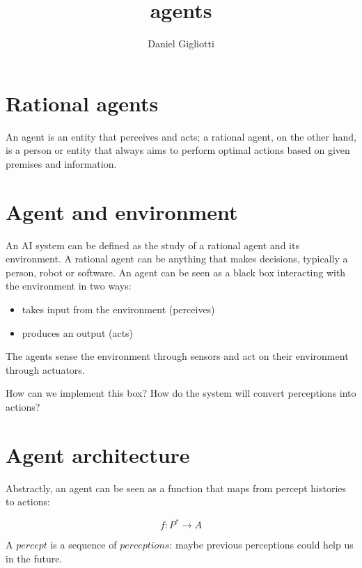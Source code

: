 \documentclass{article}
\title{agents}
\author{Daniel Gigliotti}
\date{}
\begin{document}
\maketitle

\section{Rational agents}

An agent is an entity that perceives and acts; a rational agent, on the other hand, is a person or entity that always aims to perform optimal actions based on given premises and information.

\section{Agent and environment}

An AI system can be defined as the study of a rational agent and its environment. 
A rational agent can be anything that makes decisions, typically a person, robot or software. An agent can be seen as a black box interacting with the environment in two ways:

\begin{center}
    \begin{itemize}
        \item takes input from the environment (perceives)
        \item produces an output (acts)
    \end{itemize}
\end{center}

The agents sense the environment through sensors and act on their environment through actuators.

How can we implement this box? How do the system will convert perceptions into actions?

\section{Agent architecture}

Abstractly, an agent can be seen as a function that maps from percept histories to actions:

\begin{center}
    \begin{equation}
        f: P^{*} \rightarrow A
    \end{equation}
\end{center}

A $percept$ is a sequence of $perceptions$: maybe previous perceptions could help us in the future.
\end{document}
